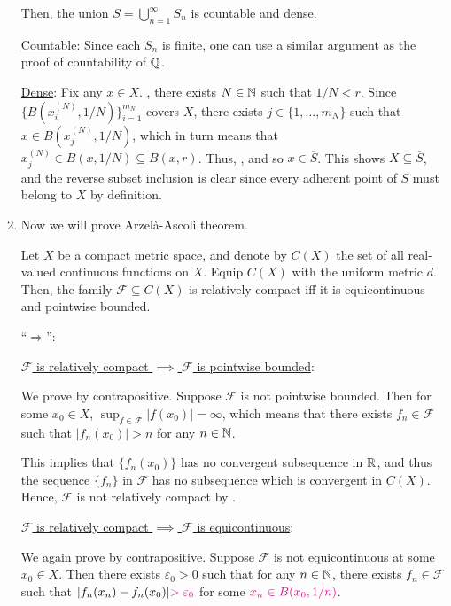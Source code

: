 \begin{enumerate}
\begin{pf}
Then, the union \(S=\bigcup_{n=1}^{\infty}S_n\) is countable and dense.

\underline{Countable}: Since each \(S_n\) is finite, one can use a similar
argument as the proof of countability of \(\mathbb{Q}\).

\underline{Dense}: Fix any \(x\in X\). , there exists \(N\in\mathbb{N}\) such
that \(1/N<r\). Since \(\{B(x_i^{(N)},1/N)\}_{i=1}^{m_N}\) covers \(X\), there
exists \(j\in\{1,\dotsc,m_N\}\) such that \(x\in B(x_j^{(N)},1/N)\), which in
turn means that \(x_j^{(N)}\in B(x,1/N)\subseteq B(x,r)\). Thus, , and so \(x\in\overline{S}\). This shows \(X\subseteq
\overline{S}\), and the reverse subset inclusion is clear since every adherent
point of \(S\) must belong to \(X\) by definition.
\end{pf}

\item Now we will prove Arzel\`a-Ascoli theorem.

\begin{theorem}
\label{thm:arzela-ascoli}
Let \(X\) be a compact metric space, and denote by \(C(X)\) the set of all
real-valued continuous functions on \(X\). Equip \(C(X)\) with the uniform
metric \(d\). Then, the family \(\mathcal{F}\subseteq C(X)\) is relatively
compact iff it is equicontinuous and pointwise bounded.
\end{theorem}
\begin{pf}
``\(\Rightarrow\)'':

\underline{\(\mathcal{F}\) is relatively compact \(\implies\) \(\mathcal{F}\)
is pointwise bounded}:

We prove by contrapositive. Suppose \(\mathcal{F}\) is not pointwise bounded.
Then for some \(x_0\in X\), \(\sup_{f\in\mathcal{F}}|f(x_0)|=\infty\), which
means that there exists \(f_n\in\mathcal{F}\) such that \(|f_n(x_0)|>n\) for
any \(n\in\mathbb{N}\).

This implies that \(\{f_n(x_0)\}\) has no convergent subsequence in \(\mathbb{R}\), and
thus the sequence \(\{f_n\}\) in \(\mathcal{F} \) has no subsequence which is
convergent in \(C(X)\). Hence, \(\mathcal{F}\) is not relatively compact by
.

\underline{\(\mathcal{F}\) is relatively compact \(\implies\) \(\mathcal{F}\)
is equicontinuous}:

We again prove by contrapositive. Suppose \(\mathcal{F}\) is not equicontinuous
at some \(x_0\in X\). Then there exists \(\varepsilon_0>0\) such that for any
\(n\in\mathbb{N}\), there exists \(f_n\in\mathcal{F}\) such that
\(|f_n(x_n)-f_n(x_0)|{\color{magenta}>\varepsilon_0}\) for some \({\color{magenta}x_n\in B(x_0,1/n)}\).


\end{pf}
\end{enumerate}
